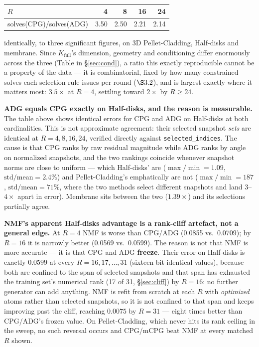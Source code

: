 \documentclass[11pt,a4paper]{article}
\newcommand{\Kfull}{K_{\mathrm{full}}}
\begin{document}
\begin{center}
\begin{tabular}{@{}lrrrr@{}}
\toprule
$R$ & 4 & 8 & 16 & 24 \\
\midrule
solves(CPG)/solves(ADG) & 3.50 & 2.50 & 2.21 & 2.14 \\
\bottomrule
\end{tabular}
\end{center}
\noindent identically, to three significant figures, on 3D Pellet-Cladding, Half-disks and
membrane. Since $\Kfull$'s dimension, geometry and conditioning differ enormously across
the three (Table in \S\ref{sec:cond}), a ratio this exactly reproducible cannot be a
property of the data --- it is combinatorial, fixed by how many constrained solves each
selection rule issues per round ($\S3.2$), and is largest exactly where it matters most:
$3.5\times$ at $R=4$, settling toward $2\times$ by $R\ge24$.

\noindent\textbf{ADG equals CPG exactly on Half-disks, and the reason is measurable.}
The table above shows identical errors for CPG and ADG on Half-disks at both
cardinalities. This is not approximate agreement: their selected snapshot \emph{sets} are
identical at $R=4,8,16,24$, verified directly against \texttt{selected\_indices}. The
cause is that CPG ranks by raw residual magnitude while ADG ranks by angle on normalized
snapshots, and the two rankings coincide whenever snapshot norms are close to uniform ---
which Half-disks' are ($\max/\min=1.09$, $\mathrm{std}/\mathrm{mean}=2.4\%$) and
Pellet-Cladding's emphatically are not ($\max/\min=187$, $\mathrm{std}/\mathrm{mean}=71\%$,
where the two methods select different snapshots and land $3$--$4\times$ apart in error).
Membrane sits between the two ($1.39\times$) and its selections partially agree.

\noindent\textbf{NMF's apparent Half-disks advantage is a rank-cliff artefact, not a
general edge.} At $R=4$ NMF is worse than CPG/ADG (0.0855 vs.\ 0.0709); by $R=16$ it is
narrowly better (0.0569 vs.\ 0.0599). The reason is not that NMF is more accurate --- it
is that CPG and ADG \textbf{freeze}. Their error on Half-disks is exactly $0.0599$ at
every $R=16,17,\dots,31$ (sixteen bit-identical values), because both are confined to the
span of selected snapshots and that span has exhausted the training set's numerical rank
(17 of 31, \S\ref{sec:cliff}) by $R=16$: no further generator can add anything. NMF is
refit from scratch at each $R$ with \emph{optimized} atoms rather than selected snapshots,
so it is not confined to that span and keeps improving past the cliff, reaching $0.0075$
by $R=31$ --- eight times better than CPG/ADG's frozen value. On Pellet-Cladding, which
never hits its rank ceiling in the sweep, no such reversal occurs and CPG/mCPG beat NMF at
every matched $R$ shown.
\end{document}
